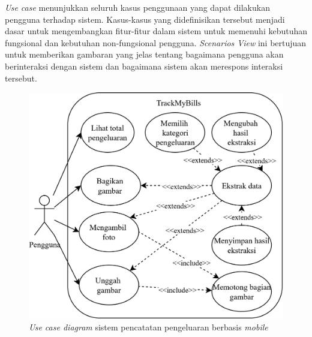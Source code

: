 \emph{Use case} menunjukkan seluruh kasus penggunaan yang dapat dilakukan pengguna terhadap sistem. Kasus-kasus yang didefinisikan tersebut menjadi dasar untuk mengembangkan fitur-fitur dalam sistem untuk memenuhi kebutuhan fungsional dan kebutuhan non-fungsional pengguna. \emph{Scenarios View} ini bertujuan untuk memberikan gambaran yang jelas tentang bagaimana pengguna akan berinteraksi dengan sistem dan bagaimana sistem akan merespons interaksi tersebut.

\begin{figure}[htbp]
    \centering
    \includegraphics[width=.9\textwidth]{images/use-case-diagram.png}
    \caption{\emph{Use case diagram} sistem pencatatan pengeluaran berbasis \emph{mobile}}
    \label{fig:use-case-diagram}
\end{figure}

